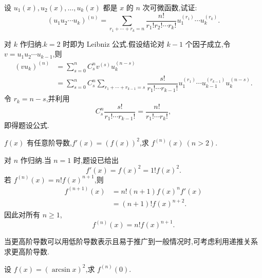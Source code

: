\begin{example}
    设 $u_1(x),u_2(x),\ldots,u_k(x)$ 都是 $x$ 的 $n$ 次可微函数,试证:
    \[
        (u_1u_2\cdots u_k)^{(n)}
        =\sum\limits_{r_1+\cdots+r_k=n}
        \dfrac{n!}{r_1!r_2!\cdots r_k!}
        u_1^{(r_1)}\cdots u_k^{(r_k)}.
    \]
\end{example}
\exampleblank

\begin{solution}
    对 $k$ 作归纳.$k=2$ 时即为 Leibniz 公式.假设结论对 $k-1$ 个因子成立,令
    $v=u_1u_2\cdots u_{k-1}$,则
    \[
        \begin{aligned}
            (vu_k)^{(n)}
             & =\sum\limits_{s=0}^{n}C_{s}^{n}v^{(s)}u_k^{(n-s)} \\
             & =\sum\limits_{s=0}^{n}C_{s}^{n}
            \sum\limits_{r_1+\cdots+r_{k-1}=s}
            \dfrac{s!}{r_1!\cdots r_{k-1}!}
            u_1^{(r_1)}\cdots u_{k-1}^{(r_{k-1})}u_k^{(n-s)}.
        \end{aligned}
    \]
    令 $r_k=n-s$,并利用
    \[
        C_s^n\dfrac{s!}{r_1!\cdots r_{k-1}!}
        =\dfrac{n!}{r_1!\cdots r_k!},
    \]
    即得题设公式.
\end{solution}

\begin{example}[\markstar]
    $f(x)$ 有任意阶导数,$f'(x)=(f(x))^2$,求 $f^{(n)}(x)\ (n>2)$.
\end{example}
\exampleblank

\begin{solution}
    对 $n$ 作归纳.当 $n=1$ 时,题设已给出
    \[
        f'(x)=f(x)^2=1!f(x)^2.
    \]
    若 $f^{(n)}(x)=n!f(x)^{n+1}$,则
    \[
        \begin{aligned}
            f^{(n+1)}(x)
             & =n!(n+1)f(x)^n f'(x) \\
             & =(n+1)!f(x)^{n+2}.
        \end{aligned}
    \]
    因此对所有 $n\geq1$,
    \[
        f^{(n)}(x)=n!f(x)^{n+1}.
    \]
\end{solution}




当更高阶导数可以用低阶导数表示且易于推广到一般情况时,可考虑利用递推关系求更高阶导数.

\begin{example}
    设 $f(x)=(\arcsin x)^2$,求 $f^{(n)}(0)$.
\end{example}
\exampleblank

